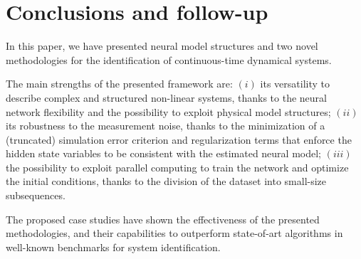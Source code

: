 \documentclass{article} %
\begin{document}
\section{Conclusions and follow-up}
\label{sec:conclusions}
% 
% 
%  

In this paper, we have presented neural model structures and two novel methodologies for the identification of continuous-time dynamical systems.

 
The main strengths of the presented framework are: $(i)$ its versatility to describe complex and structured non-linear systems, thanks to the neural network flexibility and the possibility to exploit physical model structures; $(ii)$ its robustness to the measurement noise, thanks to the minimization of a (truncated) simulation error criterion and  regularization terms  that enforce the hidden state variables to be consistent  with the estimated neural model; $(iii)$  the possibility to exploit parallel computing to train the network and optimize the initial conditions, thanks to the division of the dataset into small-size subsequences.  

The proposed case studies have shown the effectiveness of the presented methodologies, and their capabilities to outperform state-of-art algorithms in well-known benchmarks for system identification.
 
\end{document}
